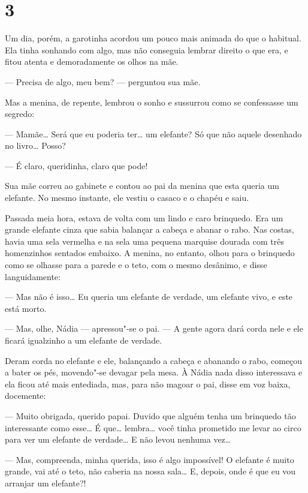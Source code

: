 \section{3}

Um dia, porém, a garotinha acordou um pouco mais animada do que o
habitual. Ela tinha sonhando com algo, mas não conseguia lembrar direito
o que era, e fitou atenta e demoradamente os olhos na mãe.

--- Precisa de algo, meu bem? --- perguntou sua mãe.

Mas a menina, de repente, lembrou o sonho e sus­surrou como se
confessasse um segredo:

--- Mamãe\ldots{} Será que eu poderia ter\ldots{} um elefante? Só que não aquele
desenhado no livro\ldots{} Posso?

--- É claro, queridinha, claro que pode!

Sua mãe correu ao gabinete e contou ao pai da me­nina que esta queria um
elefante. No mesmo instante, ele vestiu o casaco e o chapéu e saiu.

Passada meia hora, estava de volta com um lindo e caro brinquedo. Era um
grande elefante cinza que sabia balan­çar a cabeça e abanar o rabo. Nas
costas, havia uma sela vermelha e na sela uma pequena marquise dourada
com três homenzinhos sentados embaixo. A menina, no entan­to, olhou para
o brinquedo como se olhasse para a parede e o teto, com o mesmo
desânimo, e disse languidamente:

--- Mas não é isso\ldots{} Eu queria um elefante de verda­de, um elefante
vivo, e este está morto.

--- Mas, olhe, Nádia --- apressou"-se o pai. --- A gente agora dará corda
nele e ele ficará igualzinho a um ele­fante de verdade.

Deram corda no elefante e ele, balançando a cabe­ça e abanando o rabo,
começou a bater os pés, moven­do"-se devagar pela mesa. À Nádia nada
disso interessa­va e ela ficou até mais entediada, mas, para não magoar
o pai, disse em voz baixa, docemente:

--- Muito obrigada, querido papai. Duvido que al­guém tenha um brinquedo
tão interessante como esse\ldots{} É que\ldots{} lembra\ldots{} você tinha prometido me
levar ao circo para ver um elefante de verdade\ldots{} E não levou nenhuma
vez\ldots{}

--- Mas, compreenda, minha querida, isso é algo im­possível! O elefante
é muito grande, vai até o teto, não caberia na nossa sala\ldots{} E, depois,
onde é que eu vou arranjar um elefante?!

